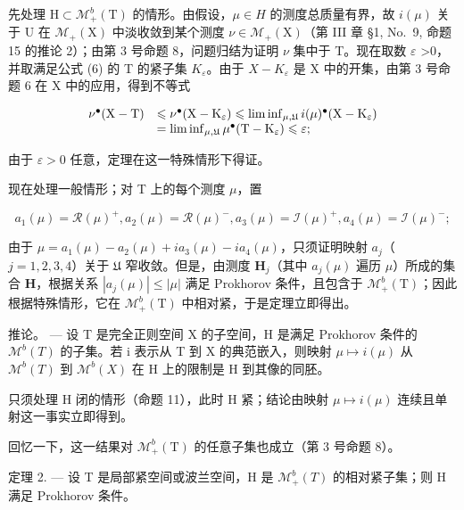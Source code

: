 先处理 \(\mathrm{H}\subset\mathcal{M}_{+}^{b}(\mathrm{T})\) 的情形。由假设，\(\mu\in H\) 的测度总质量有界，故 \(i(\mu)\) 关于 U 在 \(\mathcal{M}_{+}(\mathrm{X})\) 中淡收敛到某个测度 \(\nu\in\mathcal{M}_{+}(\mathrm{X})\)（第 III 章 §1, No.~9, 命题 15 的推论 2）；由第 3 号命题 8，问题归结为证明 \(\nu\) 集中于 T。现在取数 \(\varepsilon\) \textgreater0，并取满足公式 (6) 的 T 的紧子集 \(K_{\varepsilon}\)。由于 \(X-K_{\varepsilon}\) 是 X 中的开集，由第 3 号命题 6 在 X 中的应用，得到不等式

\[
\begin{array}{r l} \nu^ {\bullet} (\mathrm{X} - \mathrm{T}) & \leqslant \nu^ {\bullet} (\mathrm{X} - \mathrm{K} _ {\varepsilon}) \leqslant \liminf _ {\mu , \mathfrak {U}} i (\mu) ^ {\bullet} (\mathrm{X} - \mathrm{K} _ {\varepsilon}) \\ & = \liminf _ {\mu , \mathfrak {U}} \mu^ {\bullet} (\mathrm{T} - \mathrm{K} _ {\varepsilon}) \leqslant \varepsilon ; \end{array}
\]

由于 \(\varepsilon > 0\) 任意，定理在这一特殊情形下得证。

现在处理一般情形；对 T 上的每个测度 \(\mu\)，置

\[
a _ {1} (\mu) = \mathcal {R} (\mu) ^ {+}, a _ {2} (\mu) = \mathcal {R} (\mu) ^ {-}, a _ {3} (\mu) = \mathcal {I} (\mu) ^ {+}, a _ {4} (\mu) = \mathcal {I} (\mu) ^ {-};
\]

由于 \(\mu = a_{1}(\mu) - a_{2}(\mu) + ia_{3}(\mu) - ia_{4}(\mu)\)，只须证明映射 \(a_{j}\)（\(j = 1,2,3,4\)）关于 \(\mathfrak{U}\) 窄收敛。但是，由测度 \(\mathbf{H}_j\)（其中 \(a_{j}(\mu)\) 遍历 \(\mu\)）所成的集合 \(\mathbf{H}\)，根据关系 \(|a_j(\mu)| \leqslant |\mu|\) 满足 Prokhorov 条件，且包含于 \(\mathcal{M}_+^b(\mathrm{T})\)；因此根据特殊情形，它在 \(\mathcal{M}_+^b(\mathrm{T})\) 中相对紧，于是定理立即得出。

推论。 --- 设 T 是完全正则空间 X 的子空间，H 是满足 Prokhorov 条件的 \(\mathcal{M}^{b}(T)\) 的子集。若 i 表示从 T 到 X 的典范嵌入，则映射 \(\mu\mapsto i(\mu)\) 从 \(\mathcal{M}^{b}(T)\) 到 \(\mathcal{M}^{b}(X)\) 在 H 上的限制是 H 到其像的同胚。

只须处理 H 闭的情形（命题 11），此时 H 紧；结论由映射 \(\mu \mapsto i(\mu)\) 连续且单射这一事实立即得到。

回忆一下，这一结果对 \(\mathcal{M}_{+}^{b}(\mathrm{T})\) 的任意子集也成立（第 3 号命题 8）。

定理 2. --- 设 T 是局部紧空间或波兰空间，H 是 \(\mathcal{M}_{+}^{b}(T)\) 的相对紧子集；则 H 满足 Prokhorov 条件。

